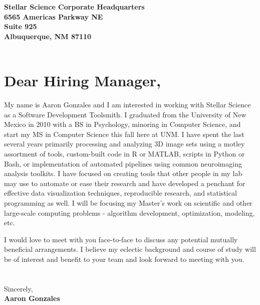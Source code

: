 \documentclass[12pt]{friggeri-cv-coverletter} %
\begin{document}

\textbf{Stellar Science Corporate Headquarters} \\
\textbf{6565 Americas Parkway NE} \\
\textbf{Suite 925} \\
\textbf{Albuquerque, NM 87110}
\\
\\

\section{Dear Hiring Manager,}

My name is Aaron Gonzales and I am interested in working with Stellar Science as a Software Development Toolsmith.
I graduated from the University of New Mexico in 2010 with a BS in Psychology, minoring in Computer Science, and 
start my MS in Computer Science this fall here at UNM. I have spent the last several years primarily processing and analyzing
3D image sets using a motley assortment of tools, custom-built code in R or MATLAB, scripts in Python or Bash, 
or implementation of automated pipelines using common neuroimaging analysis toolkits. I have focused on creating
tools that other people in my lab may use to automate or ease their research and have developed a penchant for
effective data visualization techniques, reproducible research, and statistical programming as well. I will be 
focusing my Master's work on scientific and other large-scale computing problems - algorithm development, 
optimization, modeling, etc. 

I would love to meet with you face-to-face to discuss any potential
mutually beneficial arrangements. I believe my eclectic background and course of study will be of interest and benefit
to your team and look forward to meeting with you. \\
\\
\\
Sincerely, \\
\textbf{Aaron Gonzales}

\end{document}
